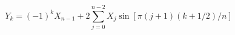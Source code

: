 \documentclass[a4paper, 12pt]{article}
\begin{document}
\begin{equation*}
Y_k = (-1)^kX_{n-1} + 2 \sum\limits_{j=0}^{n-2} X_j \sin \left[ \pi (j+1) (k+1/2) / n \right]
\end{equation*}
\end{document}
